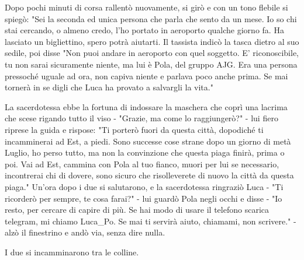 Dopo pochi minuti di corsa rallentò nuovamente, si girò e con un tono flebile si spiegò: "Sei la seconda ed unica persona che parla che sento da un mese. Io so chi stai cercando, o almeno credo, l'ho portato in aeroporto qualche giorno fa. Ha lasciato un bigliettino, spero potrà aiutarti. Il tassista indicò la tasca dietro al suo sedile, poi disse "Non puoi andare in aeroporto con quel soggetto. E' riconoscibile, tu non sarai sicuramente niente, ma lui è Pola, del gruppo AJG. Era una persona pressoché uguale ad ora, non capiva niente e parlava poco anche prima. Se mai tornerà in se digli che Luca ha provato a salvargli la vita."

La sacerdotessa ebbe la fortuna di indossare la maschera che coprì una lacrima che scese rigando tutto il viso - "Grazie, ma come lo raggiungerò?" - lui fiero riprese la guida e rispose: "Ti porterò fuori da questa città, dopodiché ti incamminerai ad Est, a piedi. Sono successe cose strane dopo un giorno di metà Luglio, ho perso tutto, ma non la convinzione che questa piaga finirà, prima o poi. Vai ad Est, cammina con Pola al tuo fianco, muori per lui se necessario, incontrerai chi di dovere, sono sicuro che risolleverete di nuovo la città da questa piaga."
Un'ora dopo i due si salutarono, e la sacerdotessa ringraziò Luca - "Ti ricorderò per sempre, te cosa farai?" - lui guardò Pola negli occhi e disse - "Io resto, per cercare di capire di più. Se hai modo di usare il telefono scarica telegram, mi chiamo Luca_Po. Se mai ti servirà aiuto, chiamami, non scrivere." - alzò il finestrino e andò via, senza dire nulla.

I due si incamminarono tra le colline.
